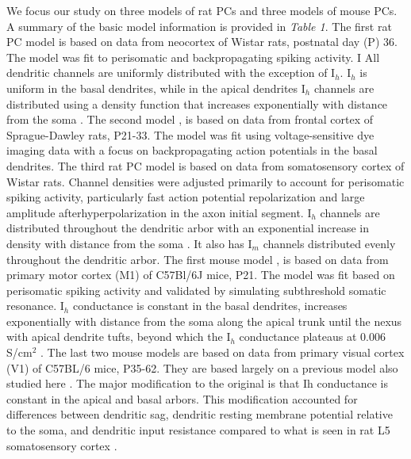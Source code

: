 \documentclass[utf8]{frontiersSCNS} %
\begin{document}
We focus our study on three models of rat PCs and three models of mouse PCs. A summary of the basic
model information is provided in \emph{Table 1}.
The first rat PC model \citep{Hay2011-if} is based on data from neocortex of Wistar rats, postnatal day (P) 36.  The model was fit to perisomatic
and backpropagating spiking activity.  I
All dendritic channels are uniformly distributed with the exception of I$_h$.  
I$_h$ is uniform in the basal dendrites, while in the apical dendrites I$_h$ channels are
distributed using a density function that increases exponentially with distance from the soma 
\citep{Nevian2007-gw, Kole2006-bm}.
The second model \citep{Acker2009-yj}, is based on data from frontal cortex of 
Sprague-Dawley rats, P21-33.  The model was fit using voltage-sensitive dye imaging data with a focus on 
backpropagating action potentials in the basal dendrites.
The third rat PC model \citep{Kole2008-aj} is based on data from somatosensory cortex of Wistar rats. Channel 
densities were adjusted  primarily to account for perisomatic spiking activity, particularly fast action potential repolarization and 
large amplitude  afterhyperpolarization in the axon initial segment.  I$_h$ channels are distributed throughout 
the dendritic arbor with an exponential increase in density with distance from the soma \citep{Kole2006-bm}.
It also has I$_m$ channels distributed evenly throughout the dendritic arbor.
The first mouse model \citep{Neymotin2017-dr}, is based on data from primary motor cortex (M1) of C57Bl/6J mice, P21.  
The model was fit based on perisomatic spiking activity and validated by simulating subthreshold somatic resonance.  
I$_h$ conductance is constant in the basal dendrites, increases exponentially with distance from the soma along the apical
trunk until the nexus with apical dendrite tufts, beyond which the I$_h$ conductance plateaus at 0.006 S/cm$^2$ \citep{Harnett2015-sj}.  
The last two mouse models \citep{Reimann2013-mg, Shai2015-ff, Markram2015-zg}
are based on data from primary visual cortex (V1) of C57BL/6 mice, P35-62. They are based largely on a previous model also 
studied here \citep{Hay2011-if}.  The major modification to the original is that Ih conductance is constant in the apical and basal arbors.
This modification accounted for differences between dendritic sag, dendritic resting membrane potential relative
to the soma, and dendritic input resistance compared to what is seen in rat L5 somatosensory cortex \citep{Shai2015-ff}.
\end{document}
